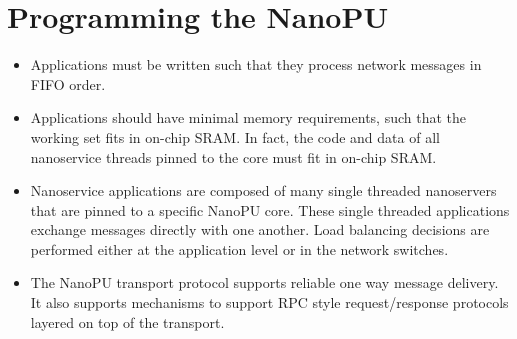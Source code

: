 \section{Programming the NanoPU}
\begin{itemize}
    \item Applications must be written such that they process network messages in FIFO order.
    \item Applications should have minimal memory requirements, such that the working set fits in on-chip SRAM. In fact, the code and data of all nanoservice threads pinned to the core must fit in on-chip SRAM.
    \item Nanoservice applications are composed of many single threaded nanoservers that are pinned to a specific NanoPU core. These single threaded applications exchange messages directly with one another. Load balancing decisions are performed either at the application level or in the network switches.
    \item The NanoPU transport protocol supports reliable one way message delivery. It also supports mechanisms to support RPC style request/response protocols layered on top of the transport.
\end{itemize}